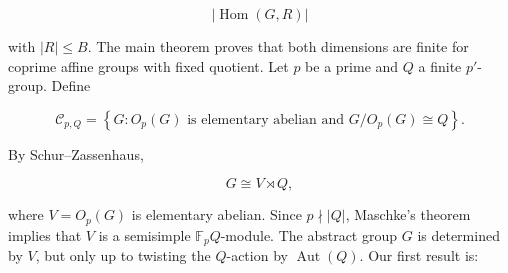 \documentclass[11pt]{article}
\begin{document}
\[
|\operatorname{Hom}(G,R)|
\]

with $|R|\le B$. The main theorem proves that both dimensions are finite for coprime affine groups with fixed quotient. Let $p$ be a prime and $Q$ a finite $p'$-group. Define

\[
\mathcal C_{p,Q}
=\left\{
G:
O_p(G)\text{ is elementary abelian and }G/O_p(G)\cong Q
\right\}.
\]

By Schur--Zassenhaus,

\[
G\cong V\rtimes Q,
\]

where $V=O_p(G)$ is elementary abelian. Since $p\nmid |Q|$, Maschke's theorem implies that $V$ is a semisimple $\mathbb F_pQ$-module. The abstract group $G$ is determined by $V$, but only up to twisting the $Q$-action by $\operatorname{Aut}(Q)$. Our first result is:
\end{document}
